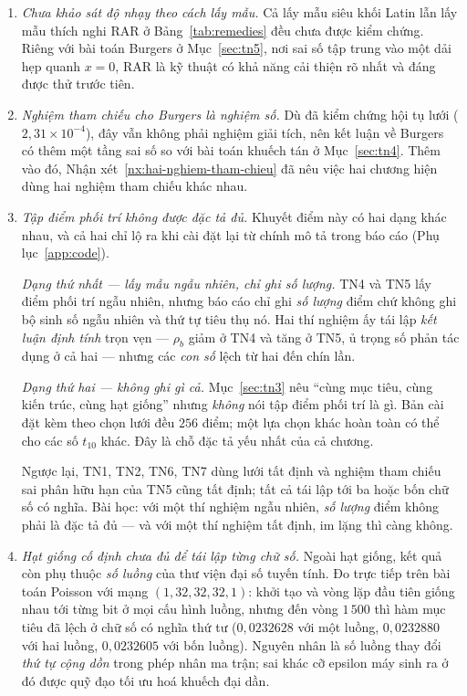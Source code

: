 \begin{enumerate}[label=(\arabic*),leftmargin=2.2em,itemsep=4pt]
\item \emph{Chưa khảo sát độ nhạy theo cách lấy mẫu.} Cả lấy mẫu siêu khối Latin
lẫn lấy mẫu thích nghi RAR ở Bảng~\ref{tab:remedies} đều chưa được kiểm chứng.
Riêng với bài toán Burgers ở Mục~\ref{sec:tn5}, nơi sai số tập trung vào một
dải hẹp quanh
$x = 0$, RAR là kỹ thuật có khả năng cải thiện rõ nhất và đáng được thử trước
tiên.
 
\item \emph{Nghiệm tham chiếu cho Burgers là nghiệm số.} Dù đã kiểm chứng hội tụ
lưới ($2{,}31\times10^{-4}$), đây vẫn không phải nghiệm giải tích, nên kết luận về
Burgers có thêm một tầng sai số so với bài toán khuếch tán ở
Mục~\ref{sec:tn4}. Thêm vào đó,
Nhận xét~\ref{nx:hai-nghiem-tham-chieu} đã nêu việc hai chương hiện dùng hai nghiệm
tham chiếu khác nhau.
 
\item \emph{Tập điểm phối trí không được đặc tả đủ.} Khuyết điểm này có hai
dạng khác nhau, và cả hai chỉ lộ ra khi cài đặt lại từ chính mô tả trong báo
cáo (Phụ lục~\ref{app:code}).

\emph{Dạng thứ nhất --- lấy mẫu ngẫu nhiên, chỉ ghi số lượng.} TN4 và TN5 lấy
điểm phối trí ngẫu nhiên, nhưng báo cáo chỉ ghi \emph{số lượng} điểm chứ không
ghi bộ sinh số ngẫu nhiên và thứ tự tiêu thụ nó. Hai thí nghiệm ấy tái lập
\emph{kết luận định tính} trọn vẹn --- $\rho_b$ giảm ở TN4 và tăng ở TN5, ủ
trọng số phản tác dụng ở cả hai --- nhưng các \emph{con số} lệch từ hai đến chín
lần.

\emph{Dạng thứ hai --- không ghi gì cả.} Mục~\ref{sec:tn3} nêu ``cùng mục tiêu,
cùng kiến trúc, cùng hạt giống'' nhưng \emph{không} nói tập điểm phối trí là gì.
Bản cài đặt kèm theo chọn lưới đều $256$ điểm; một lựa chọn khác hoàn toàn có
thể cho các số $t_{10}$ khác. Đây là chỗ đặc tả yếu nhất của cả chương.

Ngược lại, TN1, TN2, TN6, TN7 dùng lưới tất định và nghiệm tham chiếu sai phân
hữu hạn của TN5 cũng tất định; tất cả tái lập tới ba hoặc bốn chữ số có nghĩa.
Bài học: với một thí nghiệm ngẫu nhiên, \emph{số lượng} điểm không phải là đặc
tả đủ --- và với một thí nghiệm tất định, im lặng thì càng không.

\item \emph{Hạt giống cố định chưa đủ để tái lập từng chữ số.} Ngoài hạt giống,
kết quả còn phụ thuộc \emph{số luồng} của thư viện đại số tuyến tính. Đo trực
tiếp trên bài toán Poisson với mạng $(1,32,32,32,1)$: khởi tạo và vòng lặp đầu
tiên giống nhau tới từng bit ở mọi cấu hình luồng, nhưng đến vòng $1\,500$ thì
hàm mục tiêu đã lệch ở chữ số có nghĩa thứ tư ($0{,}0232628$ với một luồng,
$0{,}0232880$ với hai luồng, $0{,}0232605$ với bốn luồng). Nguyên nhân là số
luồng thay đổi \emph{thứ tự cộng dồn} trong phép nhân ma trận; sai khác cỡ
epsilon máy sinh ra ở đó được quỹ đạo tối ưu hoá khuếch đại dần.


\end{enumerate}
